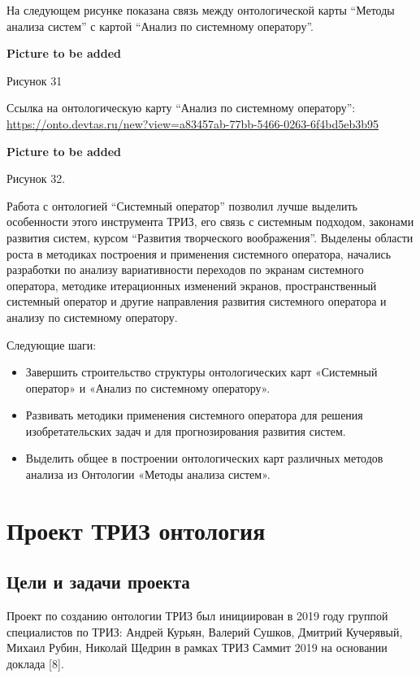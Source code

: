 \documentclass[11pt,a4paper]{article}
\newcommand{\addpicture}{\textbf{Picture to be added}\par}
\begin{document}
На следующем рисунке показана связь между онтологической карты “Методы анализа
систем” с картой “Анализ по системному оператору”.
\begin{center}
  \addpicture
  Рисунок 31
\end{center}
Ссылка на онтологическую карту “Анализ по системному оператору”:
\url{https://onto.devtas.ru/new?view=a83457ab-77bb-5466-0263-6f4bd5eb3b95}
\begin{center}
  \addpicture
  Рисунок 32.
\end{center}
Работа с онтологией “Системный оператор” позволил лучше выделить особенности
этого инструмента ТРИЗ, его связь с системным подходом, законами развития
систем, курсом “Развития творческого воображения”. Выделены области роста в
методиках построения и применения системного оператора, начались разработки по
анализу вариативности переходов по экранам системного оператора, методике
итерационных изменений экранов, пространственный системный оператор и другие
направления развития системного оператора и анализу по системному оператору.

Следующие шаги: 
\begin{itemize}
\item Завершить строительство структуры онтологических карт «Системный
  оператор» и «Анализ по системному оператору».
\item Развивать методики применения системного оператора для решения
  изобретательских задач и для прогнозирования развития систем.
\item Выделить общее в построении онтологических карт различных методов
  анализа из Онтологии «Методы анализа систем».
\end{itemize}

\section{Проект ТРИЗ онтология}
\subsection{Цели и задачи проекта}

Проект по созданию онтологии ТРИЗ был инициирован в 2019 году группой
специалистов по ТРИЗ: Андрей Курьян, Валерий Сушков, Дмитрий Кучерявый, Михаил
Рубин, Николай Щедрин в рамках ТРИЗ Саммит 2019 на основании доклада [8].
\end{document}

